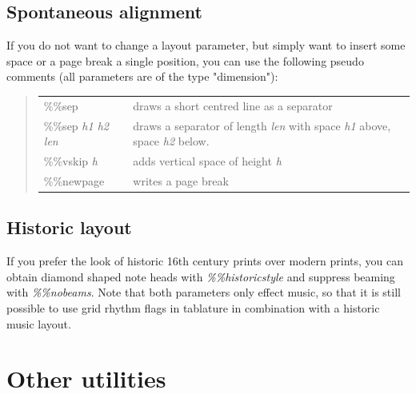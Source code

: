 \documentclass[a4paper]{article}
\begin{document}
\subsection{Spontaneous alignment}
  
If you do not want to change a layout parameter, but simply
want to insert some space or a page break a single position,
you can use the following pseudo comments (all parameters
are of the type "dimension"):
\begin{quote}
\begin{tabular}{lp{10cm}}
\%\%sep  & draws a short centred line as a separator \\
\%\%sep {\it h1 h2 len} & draws a separator of length {\it len} with space 
           {\it h1} above, space {\it h2} below. \\
\%\%vskip {\it h} & adds vertical space of height {\it h} \\
\%\%newpage   & writes a page break
\end{tabular}
\end{quote}

\subsection{Historic layout}
 
If you prefer the look of historic 16th century prints over modern
prints, you can obtain diamond shaped note heads with {\it \%\%historicstyle}
and suppress beaming with {\it \%\%nobeams}. Note that both
parameters only effect music, so that it is still possible to use
grid rhythm flags in tablature in combination with a historic music
layout.

\section{Other utilities}
\end{document}
